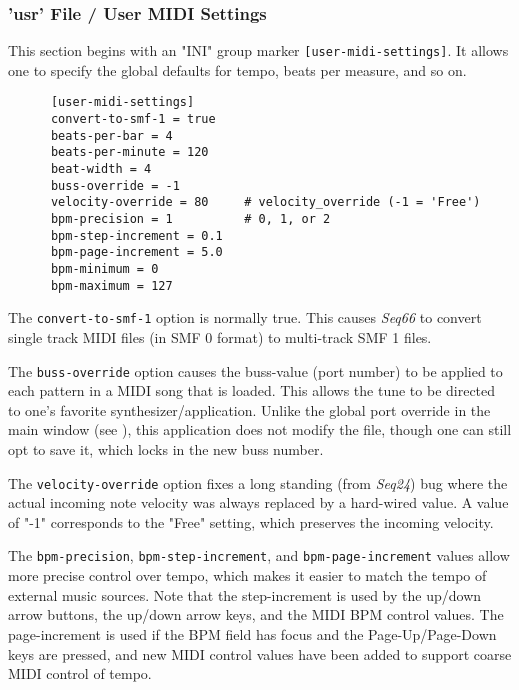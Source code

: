 \subsubsection{'usr' File / User MIDI Settings}
\label{subsubsec:usr_file_user_midi_settings}

   This section begins with an
   "INI" group marker \texttt{[user-midi-settings]}.
   It allows one to specify the
   global defaults for tempo, beats per measure, and so on.

   \begin{verbatim}
      [user-midi-settings]
      convert-to-smf-1 = true
      beats-per-bar = 4
      beats-per-minute = 120
      beat-width = 4
      buss-override = -1
      velocity-override = 80     # velocity_override (-1 = 'Free')
      bpm-precision = 1          # 0, 1, or 2
      bpm-step-increment = 0.1
      bpm-page-increment = 5.0
      bpm-minimum = 0
      bpm-maximum = 127
   \end{verbatim}

   The \texttt{convert-to-smf-1} option is normally true. This causes
   \textsl{Seq66} to convert single track MIDI files (in SMF 0 format) to
   multi-track SMF 1 files.

   The \texttt{buss-override} option causes the buss-value (port number) to be
   applied to each pattern in a MIDI song that is loaded.  This allows the tune
   to be directed to one's favorite synthesizer/application.
   Unlike the global port override in the main window
   (see ),
   this application does not modify the file, though one can still opt to save
   it, which locks in the new buss number.

   The \texttt{velocity-override} option fixes a long standing (from
   \textsl{Seq24}) bug where the actual incoming note velocity was always
   replaced by a hard-wired value.  A value of "-1" corresponds to the "Free"
   setting, which preserves the incoming velocity.

   The \texttt{bpm-precision}, \texttt{bpm-step-increment}, and
   \texttt{bpm-page-increment} values allow more precise control over tempo,
   which makes it easier to match the tempo of external music sources.  Note
   that the step-increment is used by the up/down arrow buttons, the up/down
   arrow keys, and the MIDI BPM control values.  The page-increment is used
   if the BPM field has focus and the Page-Up/Page-Down keys are pressed,
   and new MIDI control values have been added to support coarse MIDI
   control of tempo.


